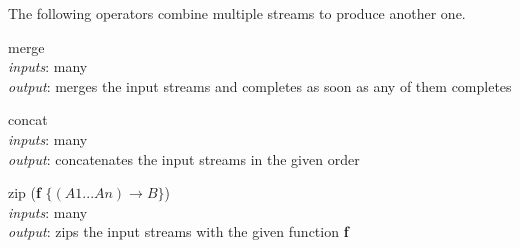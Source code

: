 \documentclass{dithesis}
\begin{document}
The following operators combine multiple streams to produce another one.
\begin{description}

\begin{minipage}[c]{\lll}
\item[merge] ~\\
	\textit{inputs}: many \\
	\textit{output}: merges the input streams and completes as soon as any of them completes
\end{minipage}
\hfill
\begin{minipage}[c]{\rrr}

\end{minipage}
\begin{minipage}[c]{\lll}
\item[concat] ~\\
	\textit{inputs}: many \\
	\textit{output}: concatenates the input streams in the given order
\end{minipage}
\hfill
\begin{minipage}[c]{\rrr}

\end{minipage}
\newline \newline \newline
\begin{minipage}[c]{\lll}
\item[zip] (\textbf{f} $\{ (A1...An) \to B \}$) \\
	\textit{inputs}: many \\
	\textit{output}: zips the input streams with the given function \textbf{f}
\end{minipage}
\hfill
\begin{minipage}[c]{\rrr}

\end{minipage}

\end{description}
\end{document}
